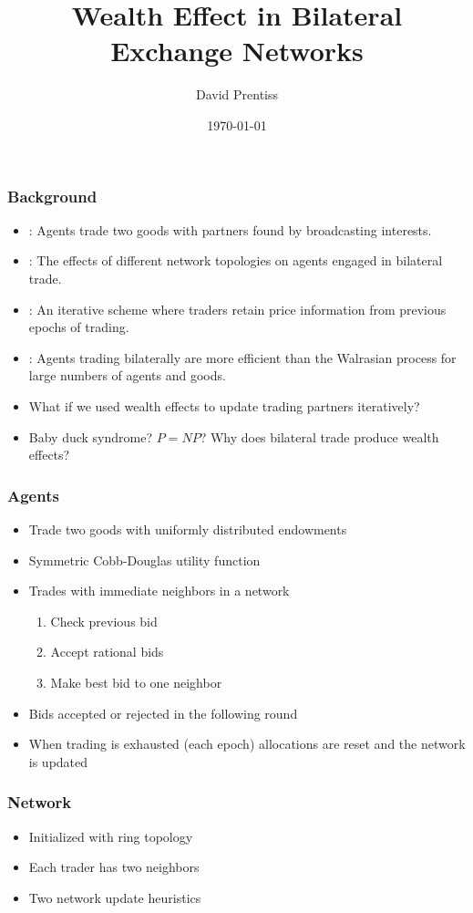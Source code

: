 \documentclass{beamer}
\begin{document}
\title{Wealth Effect in Bilateral Exchange Networks}
\author{David Prentiss}
\date{\today}

\frame{\titlepage}

\begin{frame}
  \frametitle{Background}
  \begin{itemize}
  \item \cite{albin1992decentralized}: Agents trade two goods with partners found by
    broadcasting interests.
  \item \cite{wilhite2001bilateral}: The effects of different network
  topologies on agents engaged in bilateral trade.
  \item \cite{sunder2002simple}: An iterative scheme where traders retain
  price information from previous epochs of trading.
  \item \cite{axtell2005complexity}: Agents trading bilaterally are more
    efficient than the Walrasian process for large numbers of agents and goods.
  \item What if we used wealth effects to update trading partners iteratively?
  \item Baby duck syndrome? \(P = NP\)? Why does bilateral trade produce wealth effects?
  \end{itemize}
\end{frame}

\begin{frame}
  \frametitle{Agents}
  \begin{itemize}
  \item Trade two goods with uniformly distributed endowments \citep{albin1992decentralized}
  \item Symmetric Cobb-Douglas utility function
  \item Trades with immediate neighbors in a network
    \begin{enumerate}
    \item Check previous bid
\item Accept rational bids
  \item Make best bid to one neighbor
  \end{enumerate}
  \item Bids accepted or rejected in the following round
    \item When trading is exhausted (each epoch) allocations are reset and the
      network is updated
  \end{itemize}
\end{frame}

\begin{frame}
  \frametitle{Network}
  \begin{itemize}
  \item Initialized with ring topology
  \item Each trader has two neighbors
  \item Two network update heuristics
  \end{itemize}
\end{frame}
\end{document}

